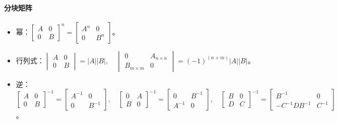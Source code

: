 \documentclass[
12pt, %
a4paper, 
oneside, %
]{scrartcl}
\begin{document}
\paragraph{分块矩阵}
\begin{itemize}
\item 幂：$ \begin{bmatrix} A & 0 \\ 0 & B \end{bmatrix}^n = \begin{bmatrix} A^n & 0 \\ 0 & B^n \end{bmatrix} $。  
\item 行列式：$ \begin{vmatrix} A & 0 \\ 0 & B \end{vmatrix} = |A||B|, \quad \begin{vmatrix} 0 & A_{n \times n} \\ B_{m \times m} & 0 \end{vmatrix} = (-1)^{(n + m)}|A||B| $。
\item 逆：$ \begin{bmatrix} A & 0 \\ 0 & B \end{bmatrix}^{-1} = \begin{bmatrix} A^{-1} & 0 \\ 0 & B^{-1} \end{bmatrix}, \quad \begin{bmatrix} 0 & A \\ B & 0 \end{bmatrix}^{-1} = \begin{bmatrix} 0 & B^{-1} \\ A^{-1} & 0 \end{bmatrix}, \quad \begin{bmatrix} B & 0 \\ D & C \end{bmatrix}^{-1} = \begin{bmatrix} B^{-1} & 0 \\ -C^{-1} D B^{-1} & C^{-1} \end{bmatrix} $。
\end{itemize}
\end{document}
